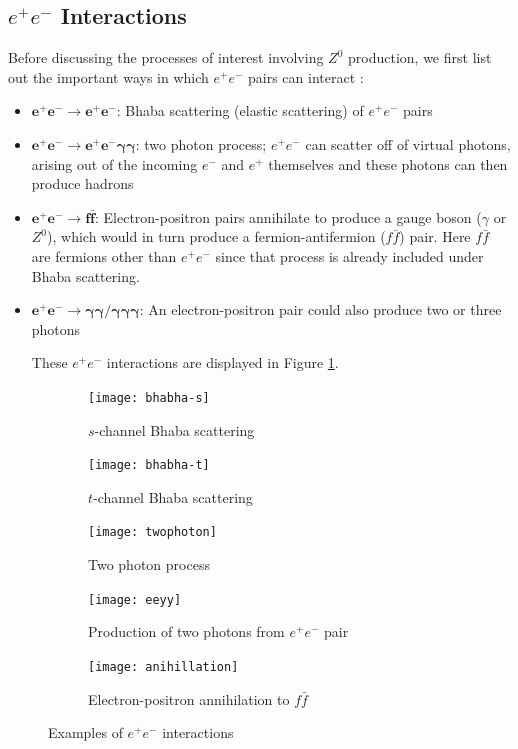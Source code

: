 \subsection{$e^{+}e^{-}$ Interactions}
Before discussing the processes of interest involving $Z^{0}$ production, we first list out the important ways in which $e^{+}e^{-}$ pairs can interact \cite{UB}:
\begin{itemize}
\item $\bm{e^{+}e^{-}\rightarrow e^{+}e^{-}}$: Bhaba scattering (elastic scattering) of $e^{+}e^{-}$ pairs 
\item $\bm{e^{+}e^{-}\rightarrow e^{+}e^{-}\gamma \gamma}$: two photon process; $e^{+}e^{-}$ can scatter off of virtual photons, arising out of the incoming $e^{-}$ and $e^{+}$ themselves and these photons can then produce hadrons
\item $\bm{e^{+}e^{-}\rightarrow f \bar{f}}$: Electron-positron pairs annihilate to produce a gauge boson ($\gamma$ or $Z^{0}$), which would in turn produce a fermion-antifermion ($f\bar{f}$) pair. Here $f\bar{f}$ are fermions other than $e^{+}e^{-}$ since that process is already included under Bhaba scattering.
\item $\bm{e^{+}e^{-}\rightarrow \gamma \gamma / \gamma \gamma \gamma}$: An electron-positron pair could also produce two or three photons 

These $e^{+}e^{-}$ interactions are displayed in Figure \ref{fig:eeint}.

\end{itemize}

\begin{figure}[H]
\centering
\begin{subfigure}{0.4\textwidth}
    \texttt{[image: bhabha-s]}
    \caption{$s$-channel Bhaba scattering}
\end{subfigure}
\begin{subfigure}{0.4\textwidth}
    \texttt{[image: bhabha-t]}
    \caption{$t$-channel Bhaba scattering}
\end{subfigure}
\begin{subfigure}{0.4\textwidth}
\centering
    \texttt{[image: twophoton]}
    \caption{Two photon process}
\end{subfigure}
\begin{subfigure}{0.4\textwidth}
\centering
    \texttt{[image: eeyy]}
    \vspace{2em}
    \caption{Production of two photons from $e^{+}e^{-}$ pair}
\end{subfigure}
\begin{subfigure}{0.45\textwidth}
    \texttt{[image: anihillation]}
    \caption{Electron-positron annihilation to $f\bar{f}$}
\end{subfigure}
\caption[Examples of $e^{+}e^{-}$ interactions]{Examples of $e^{+}e^{-}$ interactions \cite{UB,Janot:2705419,qmdiaries}}
\label{fig:eeint}
\end{figure}

